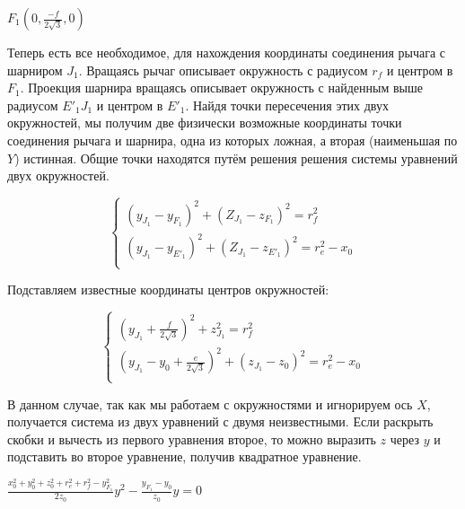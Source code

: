 \begin{center}
    $F_{1}(0,\frac{-f}{2\sqrt{3}},0)$
\end{center}

Теперь есть все необходимое, для нахождения координаты соединения рычага с шарниром $J_{1}$. Вращаясь рычаг описывает окружность с радиусом $r_{f}$ и центром в  $F_{1}$. Проекция шарнира вращаясь описывает окружность с найденным выше радиусом $E'_{1}J_{1}$ и центром в $E'_{1}$. Найдя точки пересечения этих двух окружностей, мы получим две физически возможные координаты точки соединения рычага и шарнира, одна из которых ложная, а вторая (наименьшая по $Y$) истинная. Общие точки находятся путём решения решения системы уравнений двух окружностей.

\begin{equation*}
    \begin{cases}
        (y_{J_{1}} -y_{F_{1}})^{2} +(Z_{J_{1}}-z_{F_{1}})^{2} = r^{2}_{f}\\
        (y_{J_{1}} -y_{E'_{1}})^{2} +(Z_{J_{1}}-z_{E'_{1}})^{2} = r^{2}_{e}-x_{0}\\
    \end{cases}
\end{equation*}

Подставляем известные координаты центров окружностей:


\begin{equation*}
    \begin{cases}
        (y_{J_{1}} + \frac{f}{2\sqrt{3}})^{2} + z^{2}_{J_{1}} = r^{2}_{f}\\
        (y_{J_{1}} -y_{0} +\frac{e}{2\sqrt{3}})^{2} +(z_{J_{1}} -z_{0})^{2} = r^{2}_{e}-x_{0}\\
    \end{cases}
\end{equation*}

 В данном случае, так как мы работаем с окружностями и игнорируем ось $X$, получается система из двух уравнений с двумя неизвестными. Если раскрыть скобки и вычесть из первого уравнения второе, то можно выразить $z$ через $y$ и подставить во второе уравнение, получив квадратное уравнение.

 \begin{center}
\vspace{0.75cm}
 $\frac{x^{2}_{0}+y^{2}_{0}+z^{2}_{0}+r^{2}_{e}+r^{2}_{f} -y^{2}_{F_{1}} }{2z_{0}}y^{2} - \frac{y_{F_{1}}-y_{0}}{z_{0}}y = 0$
\end{center}






